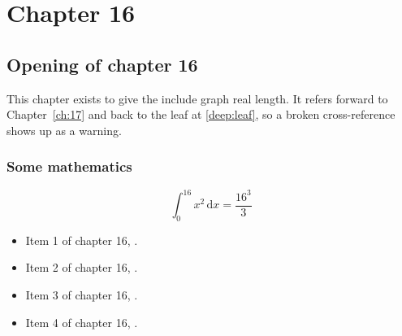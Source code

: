 \chapter{Chapter 16}
\label{ch:16}
\section{Opening of chapter 16}
This chapter exists to give the include graph real length. It refers
forward to Chapter~\ref{ch:17} and back to the leaf
at \ref{deep:leaf}, so a broken cross-reference shows up as a warning.

\subsection{Some mathematics}
\begin{equation}
  \int_0^{16} x^{2} \, \mathrm{d}x = \frac{16^{3}}{3}
\end{equation}

\begin{itemize}
  \item Item 1 of chapter 16, .
  \item Item 2 of chapter 16, .
  \item Item 3 of chapter 16, .
  \item Item 4 of chapter 16, .
\end{itemize}
